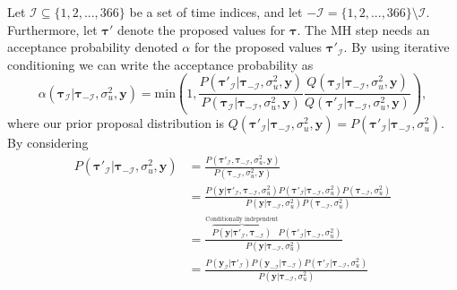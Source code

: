 \documentclass[
]{article}
\begin{document}
Let \(\mathcal{I} \subseteq \{1,2,...,366\}\) be a set of time indices, and let \(- \mathcal{I} = \{1,2,...,366\} \setminus \mathcal{I}\). Furthermore, let \(\boldsymbol{\tau}'\) denote the proposed values for \(\boldsymbol{\tau}\). The MH step needs an acceptance probability denoted \(\alpha\) for the proposed values \(\boldsymbol{\tau}'_\mathcal{I}\). By using iterative conditioning we can write the acceptance probability as
\[
 \alpha(\boldsymbol{\tau}_ \mathcal{I}| \boldsymbol{\tau}_ {-\mathcal{I}}, \sigma_u^2, \boldsymbol{y}) 
 = \text{min} \left( 1, \frac{P( \boldsymbol{\tau}'_ \mathcal{I}| \boldsymbol{\tau}_ {-\mathcal{I}}, \sigma_u^2, \boldsymbol{y})}
 {P( \boldsymbol{\tau}_ \mathcal{I}| \boldsymbol{\tau}_ {-\mathcal{I}}, \sigma_u^2, \boldsymbol{y})} 
 \frac{Q( \boldsymbol{\tau}_\mathcal{I}|\boldsymbol{\tau}_{-\mathcal{I}}, \sigma_u^2, \boldsymbol{y})}
 {Q(\boldsymbol{\tau}'_ \mathcal{I}|\boldsymbol{\tau}_{-\mathcal{I}}, \sigma_u^2, \boldsymbol{y})}
 \right),
\]
where our prior proposal distribution is \(Q(\boldsymbol{\tau}'_\mathcal{I}|\boldsymbol{\tau}_{-\mathcal{I}}, \sigma_u^2, \boldsymbol{y}) = P(\boldsymbol{\tau}'_\mathcal{I}|\boldsymbol{\tau}_{-\mathcal{I}}, \sigma_u^2)\). By considering
\[
\begin{aligned}
  P( \boldsymbol{\tau}'_ \mathcal{I}| \boldsymbol{\tau}_ {-\mathcal{I}}, \sigma_u^2, \boldsymbol{y}) &= \frac{P( \boldsymbol{\tau}'_ \mathcal{I}, \boldsymbol{\tau}_ {-\mathcal{I}}, \sigma_u^2, \boldsymbol{y})}{P( \boldsymbol{\tau}_ {-\mathcal{I}}, \sigma_u^2, \boldsymbol{y})} 
  \\
  &= \frac{P(\boldsymbol{y}| \boldsymbol{\tau}'_ \mathcal{I}, \boldsymbol{\tau}_ {-\mathcal{I}}, \sigma_u^2)P(\boldsymbol{\tau}'_ \mathcal{I}| \boldsymbol{\tau}_ {-\mathcal{I}}, \sigma_u^2)P(\boldsymbol{\tau}_ {-\mathcal{I}}, \sigma_u^2)}{P(\boldsymbol{y}| \boldsymbol{\tau}_ {-\mathcal{I}}, \sigma_u^2) P(\boldsymbol{\tau}_ {-\mathcal{I}}, \sigma_u^2)}
  \\
  &= \frac{\overbrace{P(\boldsymbol{y}| \boldsymbol{\tau}'_ \mathcal{I}, \boldsymbol{\tau}_ {-\mathcal{I}})}^{\text{Conditionally independent}} P(\boldsymbol{\tau}'_ \mathcal{I}| \boldsymbol{\tau}_ {-\mathcal{I}}, \sigma_u^2)}{P(\boldsymbol{y}| \boldsymbol{\tau}_ {-\mathcal{I}}, \sigma_u^2)}
  \\
  &= \frac{P(\boldsymbol{y}_\mathcal{I}| \boldsymbol{\tau}'_ \mathcal{I})P(\boldsymbol{y}_\mathcal{-I}| \boldsymbol{\tau}_ \mathcal{-I}) P(\boldsymbol{\tau}'_ \mathcal{I}| \boldsymbol{\tau}_ {-\mathcal{I}}, \sigma_u^2)}{P(\boldsymbol{y}| \boldsymbol{\tau}_ {-\mathcal{I}}, \sigma_u^2)}
\end{aligned}
\]
\end{document}
